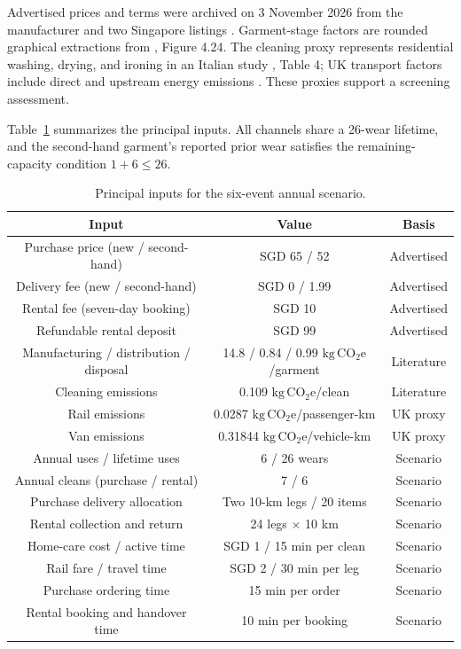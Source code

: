 \documentclass[11pt,a4paper]{article}
\newcommand{\co}{\ensuremath{\mathrm{kg\,CO_2e}}}
\newcommand{\tablestyle}{\small\renewcommand{\arraystretch}{1.12}\setlength{\tabcolsep}{5pt}}
\begin{document}
Advertised prices and terms were archived on 3 November 2026 from the manufacturer and two Singapore listings \citep{lovebonito,usedquote,rentalquote}. Garment-stage factors are rounded graphical extractions from \citet{sandin2019}, Figure 4.24. The cleaning proxy represents residential washing, drying, and ironing in an Italian study \citep{monticelli2023}, Table 4; UK transport factors include direct and upstream energy emissions \citep{desnz2026}. These proxies support a screening assessment.

Table~\ref{tab:inputs} summarizes the principal inputs. All channels share a 26-wear lifetime, and the second-hand garment's reported prior wear satisfies the remaining-capacity condition $1+6\leq26$.

\begin{table}[htbp]
\caption{Principal inputs for the six-event annual scenario.}
\label{tab:inputs}
\centering\tablestyle
\begin{tabular}{@{}ccc@{}}
\toprule
Input & Value & Basis\\\midrule
Purchase price (new / second-hand) & SGD 65 / 52 & Advertised\\
Delivery fee (new / second-hand) & SGD 0 / 1.99 & Advertised\\
Rental fee (seven-day booking) & SGD 10 & Advertised\\
Refundable rental deposit & SGD 99 & Advertised\\
Manufacturing / distribution / disposal & 14.8 / 0.84 / 0.99 \co/garment & Literature\\
Cleaning emissions & 0.109 \co/clean & Literature\\
Rail emissions & 0.0287 \co/passenger-km & UK proxy\\
Van emissions & 0.31844 \co/vehicle-km & UK proxy\\
Annual uses / lifetime uses & 6 / 26 wears & Scenario\\
Annual cleans (purchase / rental) & 7 / 6 & Scenario\\
Purchase delivery allocation & Two 10-km legs / 20 items & Scenario\\
Rental collection and return & 24 legs $\times$ 10 km & Scenario\\
Home-care cost / active time & SGD 1 / 15 min per clean & Scenario\\
Rail fare / travel time & SGD 2 / 30 min per leg & Scenario\\
Purchase ordering time & 15 min per order & Scenario\\
Rental booking and handover time & 10 min per booking & Scenario\\
\bottomrule
\end{tabular}
\end{table}
\end{document}
